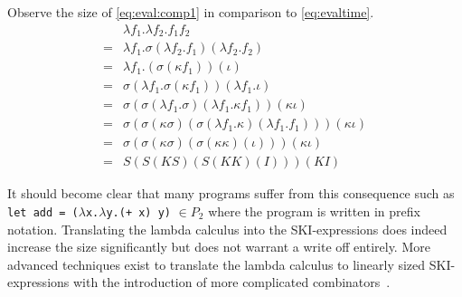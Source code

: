 \documentclass[11pt,oneside,a4paper]{report}
\begin{document}
\begin{exmp}
    Observe the size of \autoref{eq:eval:comp1} in comparison to \autoref{eq:evaltime}.
\begin{align}
    &\lambda f_1 . \lambda f_2 . f_1 f_2 \label{eq:eval:comp1}\\
    =&\lambda f_1 . \sigma(\lambda f_2 . f_1)(\lambda f_2 . f_2) \tag*{} \\
    =&\lambda f_1 . (\sigma(\kappa f_1))(\iota) \tag*{} \\
    =&\sigma (\lambda f_1 . \sigma (\kappa f_1)) (\lambda f_1 . \iota) \tag*{} \\
    =&\sigma (\sigma (\lambda f_1 . \sigma) (\lambda f_1 . \kappa f_1)) (\kappa \iota) \tag*{} \\
    =&\sigma (\sigma (\kappa \sigma) (\sigma (\lambda f_1 . \kappa) (\lambda f_1 . f_1))) (\kappa \iota) \tag*{} \\
    =&\sigma (\sigma (\kappa \sigma) (\sigma (\kappa \kappa) (\iota))) (\kappa \iota) \tag*{} \\
    =&S (S (K S) (S (K K) (I))) (K I) \tag*{}
\end{align}
\end{exmp}
It should become clear that many programs suffer from this consequence such as \texttt{let add = ($\lambda$x.$\lambda$y.(+ x) y)} $\in P_2$ where the program is written in prefix notation.
Translating the lambda calculus into the SKI-expressions does indeed increase the size significantly but does not warrant a write off entirely.
More advanced techniques exist to translate the lambda calculus to linearly sized SKI-expressions with the introduction of more complicated combinators~\cite{kiselyov2018lambda}.
\end{document}
